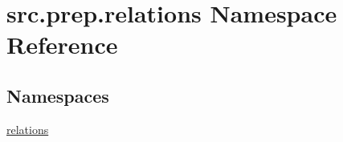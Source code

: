 \hypertarget{namespacesrc_1_1prep_1_1relations}{}\section{src.\+prep.\+relations Namespace Reference}
\label{namespacesrc_1_1prep_1_1relations}
\subsection*{Namespaces}
\begin{DoxyCompactItemize}
\item 
 \hyperlink{namespacesrc_1_1prep_1_1relations_1_1relations}{relations}
\end{DoxyCompactItemize}
